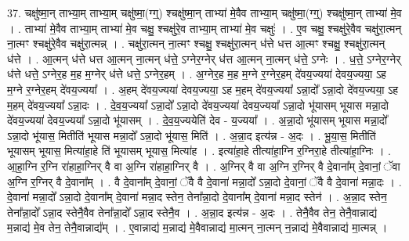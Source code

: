 \documentclass[17pt]{extarticle}
\begin{document}
37. चक्षु॑ष्मा॒न् ताभ्या॒म् ताभ्या॒म् चक्षु॑ष्मा॒(ग्ग्॒) श्चक्षु॑ष्मा॒न् ताभ्या॑ मे॒वैव ताभ्या॒म् चक्षु॑ष्मा॒(ग्ग्॒) श्चक्षु॑ष्मा॒न् ताभ्या॑ मे॒व । . ताभ्या॑ मे॒वैव ताभ्या॒म् ताभ्या॑ मे॒व चक्षु॒ श्चक्षु॑रे॒व ताभ्या॒म् ताभ्या॑ मे॒व चक्षुः॑ । . ए॒व चक्षु॒ श्चक्षु॑रे॒वैव चक्षु॑रा॒त्मन् ना॒त्मꣳ श्चक्षु॑रे॒वैव चक्षु॑रा॒त्मन्न् । . चक्षु॑रा॒त्मन् ना॒त्मꣳ श्चक्षु॒ श्चक्षु॑रा॒त्मन् ध॑त्ते धत्त आ॒त्मꣳ श्चक्षु॒ श्चक्षु॑रा॒त्मन् ध॑त्ते । . आ॒त्मन् ध॑त्ते धत्त आ॒त्मन् ना॒त्मन् ध॑त्ते॒ ऽग्नेर॒ग्नेर् ध॑त्त आ॒त्मन् ना॒त्मन् ध॑त्ते॒ ऽग्नेः । . ध॒त्ते॒ ऽग्नेर॒ग्नेर् ध॑त्ते धत्ते॒ ऽग्नेर॒ह म॒ह म॒ग्नेर् ध॑त्ते धत्ते॒ ऽग्नेर॒हम् । . अ॒ग्नेर॒ह म॒ह म॒ग्ने र॒ग्नेर॒हम् दे॑वय॒ज्यया॑ देवय॒ज्यया॒ ऽह म॒ग्ने र॒ग्नेर॒हम् दे॑वय॒ज्यया᳚ । . अ॒हम् दे॑वय॒ज्यया॑ देवय॒ज्यया॒ ऽह म॒हम् दे॑वय॒ज्यया᳚ ऽन्ना॒दो᳚ ऽन्ना॒दो दे॑वय॒ज्यया॒ ऽह म॒हम् दे॑वय॒ज्यया᳚ ऽन्ना॒दः । . दे॒व॒य॒ज्यया᳚ ऽन्ना॒दो᳚ ऽन्ना॒दो दे॑वय॒ज्यया॑ देवय॒ज्यया᳚ ऽन्ना॒दो भू॑यासम् भूयास मन्ना॒दो दे॑वय॒ज्यया॑ देवय॒ज्यया᳚ ऽन्ना॒दो भू॑यासम् । . दे॒व॒य॒ज्ययेति॑ देव - य॒ज्यया᳚ । . अ॒न्ना॒दो भू॑यासम् भूयास मन्ना॒दो᳚ ऽन्ना॒दो भू॑यास॒ मितीति॑ भूयास मन्ना॒दो᳚ ऽन्ना॒दो भू॑यास॒ मिति॑ । . अ॒न्ना॒द इत्य॑न्न - अ॒दः । . भू॒या॒स॒ मितीति॑ भूयासम् भूयास॒ मित्या॑हा॒हे ति॑ भूयासम् भूयास॒ मित्या॑ह । . इत्या॑हा॒हे तीत्या॑हा॒ग्नि र॒ग्निरा॒हे तीत्या॑हा॒ग्निः । . आ॒हा॒ग्नि र॒ग्नि रा॑हाहा॒ग्निर् वै वा अ॒ग्नि रा॑हाहा॒ग्निर् वै । . अ॒ग्निर् वै वा अ॒ग्नि र॒ग्निर् वै दे॒वाना᳚म् दे॒वानां॒ ॅवा अ॒ग्नि र॒ग्निर् वै दे॒वाना᳚म् । . वै दे॒वाना᳚म् दे॒वानां॒ ॅवै वै दे॒वाना॑ मन्ना॒दो᳚ ऽन्ना॒दो दे॒वानां॒ ॅवै वै दे॒वाना॑ मन्ना॒दः । . दे॒वाना॑ मन्ना॒दो᳚ ऽन्ना॒दो दे॒वाना᳚म् दे॒वाना॑ मन्ना॒द स्तेन॒ तेना᳚न्ना॒दो दे॒वाना᳚म् दे॒वाना॑ मन्ना॒द स्तेन॑ । . अ॒न्ना॒द स्तेन॒ तेना᳚न्ना॒दो᳚ ऽन्ना॒द स्तेनै॒वैव तेना᳚न्ना॒दो᳚ ऽन्ना॒द स्तेनै॒व । . अ॒न्ना॒द इत्य॑न्न - अ॒दः । . तेनै॒वैव तेन॒ तेनै॒वान्नाद्य॑ म॒न्नाद्य॑ मे॒व तेन॒ तेनै॒वान्नाद्य᳚म् । . ए॒वान्नाद्य॑ म॒न्नाद्य॑ मे॒वैवान्नाद्य॑ मा॒त्मन् ना॒त्मन् न॒न्नाद्य॑ मे॒वैवान्नाद्य॑ मा॒त्मन्न् । \newline
\pagebreak
{}
\end{document}
